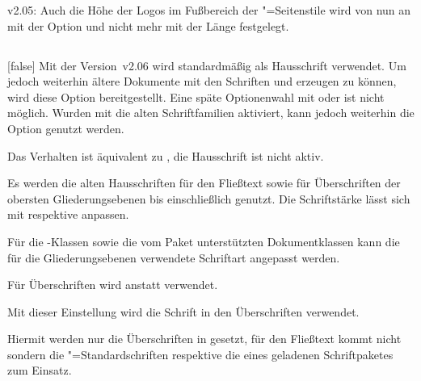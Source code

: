 \begin{Obsolete}{v2.05:}{}%
\printobsoletelist%
%
Auch die Höhe der Logos im Fußbereich der "=Seitenstile 
wird von nun an mit der Option  und nicht mehr mit der 
Länge  festgelegt.
\end{Obsolete}


\subsection{}
\begin{Declaration}[v2.06]{}[false]
\printdeclarationlist%
%
Mit der Version~v2.06 wird standardmäßig \OpenSans als Hausschrift verwendet. 
Um jedoch weiterhin ältere Dokumente mit den Schriften \Univers und \DIN 
erzeugen zu können, wird diese Option bereitgestellt.
 Eine späte Optionenwahl mit  oder  ist 
nicht möglich. Wurden mit  die alten Schriftfamilien 
aktiviert, kann jedoch weiterhin die Option  genutzt werden.
%
\begin{values}{}
\item[false]
  Das Verhalten ist äquivalent zu , die Hausschrift ist 
  nicht aktiv.
\item[true]
  Es werden die alten Hausschriften \Univers für den Fließtext sowie \DIN für 
  Überschriften der obersten Gliederungsebenen bis einschließlich 
   genutzt. Die Schriftstärke lässt sich mit 
   respektive  anpassen.
\end{values}
%
Für die \TUDScript-Klassen sowie die vom Paket  
unterstützten Dokumentklassen kann die für die Gliederungsebenen verwendete 
Schriftart angepasst werden.
%
\begin{values}{}
\item[nodin]
  Für Überschriften wird \Univers anstatt \DIN verwendet.
\item[din]
  Mit dieser Einstellung wird die Schrift \DIN in den Überschriften verwendet. 
\item[onlydin]
  Hiermit werden nur die Überschriften in \DIN gesetzt, für den Fließtext kommt 
  nicht \Univers sondern die "=Standardschriften respektive die 
  eines geladenen Schriftpaketes zum Einsatz.
\end{values}
\end{Declaration}


